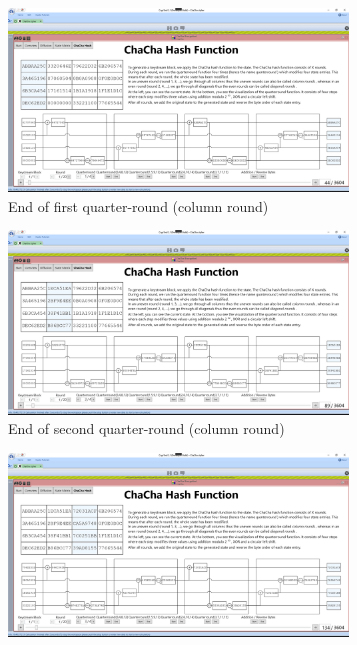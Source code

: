 \begin{figure}
\centering
\begin{subfigure}{0.5\textwidth}
  \centering
  \includegraphics[width=0.99\textwidth]{figures/ct2/chachahash/chachahash-cr1-end.png}
  \caption{End of first quarter-round (column round)}
  \label{fig:chachahash.cr.1}
\end{subfigure}%
\begin{subfigure}{0.5\textwidth}
  \centering
  \includegraphics[width=0.99\textwidth]{figures/ct2/chachahash/chachahash-cr2-end.png}
  \caption{End of second quarter-round (column round)}
  \label{fig:chachahash.cr.2}
\end{subfigure}
\begin{subfigure}{0.5\textwidth}
  \centering
  \includegraphics[width=0.99\textwidth]{figures/ct2/chachahash/chachahash-cr3-end.png}

\end{subfigure}
\end{figure}
